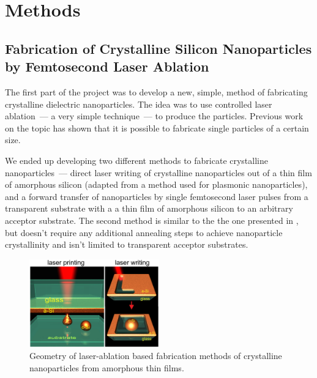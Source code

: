 \section{Methods}
\label{ch:Exp}

    \subsection{Fabrication of Crystalline Silicon Nanoparticles by Femtosecond Laser Ablation}
    \label{sec:Ablation}
            The first part of the project was to develop a new, simple, method of fabricating crystalline dielectric
        nanoparticles. The idea was to use controlled laser ablation~--- a very simple technique~--- to produce the particles.
        Previous work on the topic\cite{kuznetsov2012magnetic, zywietz2014laser} has shown that it is possible to fabricate single particles
        of a certain size.

            We ended up developing two different methods to fabricate crystalline nanoparticles~--- direct laser writing of crystalline
        nanoparticles out of a thin film of amorphous silicon (adapted from a method used for plasmonic nanoparticles\cite{makarov2016controllable,
        dmitriev2016direct}), and a forward transfer of nanoparticles by single femtosecond laser pulses
        from a transparent substrate with a a thin film of amorphous silicon to an arbitrary acceptor substrate. The second method is
        similar to the the one presented in \cite{zywietz2014laser}, but doesn't require any additional annealing steps to achieve
        nanoparticle crystallinity and isn't limited to transparent acceptor substrates.

        \begin{figure}[h!]
                \begin{center}
                    \includegraphics[width=0.5\textwidth]{figs/methods/LaserPrinting.eps}
                \end{center}
                \caption{Geometry of laser-ablation based fabrication methods of crystalline nanoparticles from amorphous
                            thin films.}
                \label{fig:LaserPrinting}
        \end{figure}


